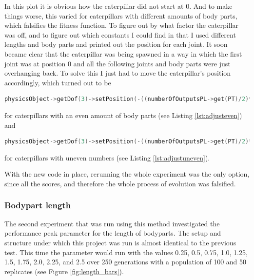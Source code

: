 \documentclass[12pt,oneside,listof=totoc,paper=a4,headings=small]{scrbook}
\begin{document}
In this plot it is obvious how the caterpillar did not start at 0.
And to make things worse, this varied for caterpillars with different amounts of body parts, which falsifies the fitness function. 
To figure out by what factor the caterpillar was off, and to figure out which constants I could find in that I used different lengths and body parts and printed out the position for each joint. It soon became clear that the caterpillar was being spawned in a way in which the first joint was at position 0 and all the following joints and body parts were just overhanging back. To solve this I just had to move the caterpillar's position accordingly, which turned out to be 
\begin{lstlisting}[language=C++, label={lst:adjusteven}, caption=Adjusting Spawn Position Even]
physicsObject->getDof(3)->setPosition(-((numberOfOutputsPL->get(PT)/2)*((jointLengthPL->get(PT)+default_width)))+((jointLengthPL->get(PT)+default_width)*0.5));

\end{lstlisting}
for caterpillars with an even amount of body parts (see Listing \ref{lst:adjusteven}) and
\begin{lstlisting}[language=C++, label={lst:adjustuneven}, caption=Adjusting Spawn Position Uneven]
physicsObject->getDof(3)->setPosition(-((numberOfOutputsPL->get(PT)/2)*((jointLengthPL->get(PT)+default_width)))); 

\end{lstlisting}
for caterpillars with uneven numbers (see Listing \ref{lst:adjustuneven}).

With the new code in place, rerunning the whole experiment was the only option, since all the scores, and therefore the whole process of evolution was falsified. 

\subsubsection{Bodypart length}
The second experiment that was run using this method investigated the performance peak parameter for the length of bodyparts. The setup and structure under which this project was run is almost identical to the previous test. This time the parameter would run with the values 0.25, 0.5, 0.75, 1.0, 1.25, 1.5, 1.75, 2.0, 2.25, and 2.5 over 250 generations with a population of 100 and 50 replicates (see Figure \ref{fig:length_bars}). 
\end{document}

